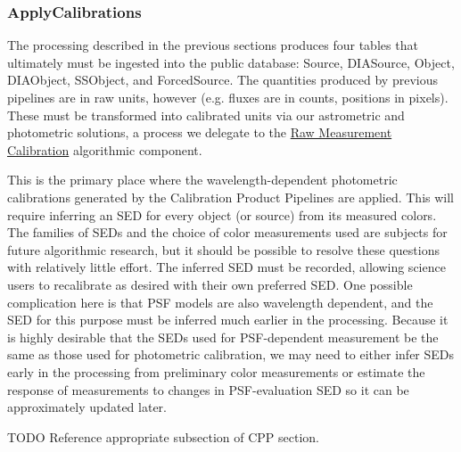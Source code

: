 \subsubsection{ApplyCalibrations}
\label{sec:drpApplyCalibrations}

The processing described in the previous sections produces four tables that ultimately must be ingested into the public database: Source, DIASource, Object, DIAObject, SSObject, and ForcedSource.  The quantities produced by previous pipelines are in raw units, however (e.g. fluxes are in counts, positions in pixels).  These must be transformed into calibrated units via our astrometric and photometric solutions, a process we delegate to the \hyperref[sec:acRawMeasurementCalibration]{Raw Measurement Calibration} algorithmic component.

This is the primary place where the wavelength-dependent photometric calibrations generated by the Calibration Product Pipelines are applied.  This will require inferring an SED for every object (or source) from its measured colors.  The families of SEDs and the choice of color measurements used are subjects for future algorithmic research, but it should be possible to resolve these questions with relatively little effort.  The inferred SED must be recorded, allowing science users to recalibrate as desired with their own preferred SED.  One possible complication here is that PSF models are also wavelength dependent, and the SED for this purpose must be inferred much earlier in the processing.  Because it is highly desirable that the SEDs used for PSF-dependent measurement be the same as those used for photometric calibration, we may need to either infer SEDs early in the processing from preliminary color measurements or estimate the response of measurements to changes in PSF-evaluation SED so it can be approximately updated later.

\begin{note}{TODO}
Reference appropriate subsection of CPP section.
\end{note}

